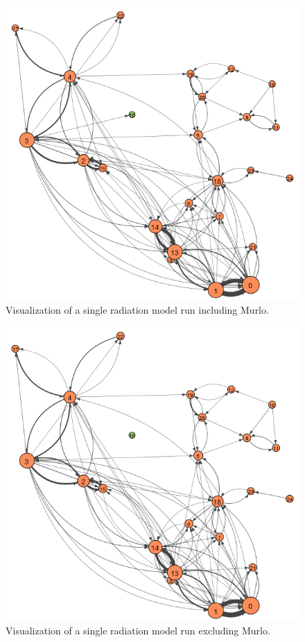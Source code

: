 \documentclass[12pt,a4paper]{thesis}
\begin{document}
\begin{figure}[H]
\centering
\includegraphics[width=0.9\linewidth]{./BeforeViz/radModel}
\caption{Visualization of a single radiation model run including Murlo.}
\label{fig:radModelBefore}
\end{figure}


\begin{figure}[H]
\centering
\includegraphics[width=0.9\linewidth]{./AfterViz/radModel}
\caption{Visualization of a single radiation model run excluding Murlo.}
\label{fig:radModelAfter}
\end{figure}
\end{document}
